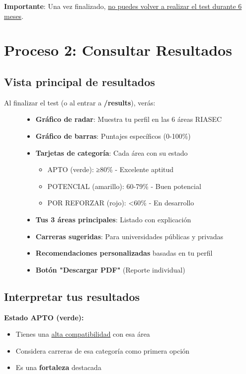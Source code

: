 \documentclass[12pt, a4paper]{report}
\begin{document}
\textbf{Importante}: Una vez finalizado, \underline{no puedes volver a realizar el test durante 6 meses}.

\section{Proceso 2: Consultar Resultados}

\subsection{Vista principal de resultados}
Al finalizar el test (o al entrar a \textbf{/results}), verás:

\begin{figure}[H]
\centering
\begin{tcolorbox}[colback=lightgray, colframe=primaryblue, title=Vista de Resultados - Elementos Clave]
\begin{itemize}
    \item \textbf{Gráfico de radar}: Muestra tu perfil en las 6 áreas RIASEC
    \item \textbf{Gráfico de barras}: Puntajes específicos (0-100\%)
    \item \textbf{Tarjetas de categoría}: Cada área con su estado
    \begin{itemize}
        \item \textcolor{successgreen}{APTO (verde)}: ≥80\% - Excelente aptitud
        \item \textcolor{warningorange}{POTENCIAL (amarillo)}: 60-79\% - Buen potencial
        \item \textcolor{dangerred}{POR REFORZAR (rojo)}: <60\% - En desarrollo
    \end{itemize}
    \item \textbf{Tus 3 áreas principales}: Listado con explicación
    \item \textbf{Carreras sugeridas}: Para universidades públicas y privadas
    \item \textbf{Recomendaciones personalizadas} basadas en tu perfil
    \item \textbf{Botón "Descargar PDF"} (Reporte individual)
\end{itemize}
\end{tcolorbox}
\end{figure}

\subsection{Interpretar tus resultados}
\textbf{Estado APTO (verde):}
\begin{itemize}
    \item Tienes una \underline{alta compatibilidad} con esa área
    \item Considera carreras de esa categoría como primera opción
    \item Es una \textbf{fortaleza} destacada
\end{itemize}
\end{document}
